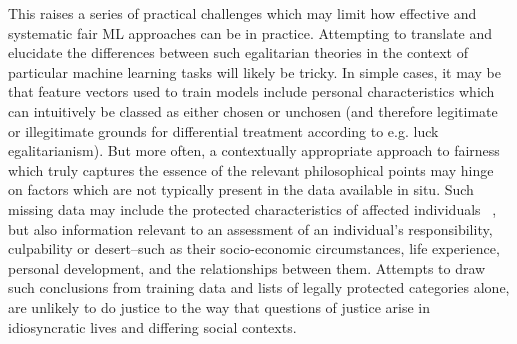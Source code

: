 \documentclass[pmlr,twocolumn,10pt]{jmlr}%
\begin{document}
This raises a series of practical challenges which may limit how effective and systematic fair ML approaches can be in practice. Attempting to translate and elucidate the differences between such egalitarian theories in the context of particular machine learning tasks will likely be tricky. In simple cases, it may be that feature vectors used to train models include personal characteristics which can intuitively be classed as either chosen or unchosen (and therefore legitimate or illegitimate grounds for differential treatment according to e.g. luck egalitarianism). But more often, a contextually appropriate approach to fairness which truly captures the essence of the relevant philosophical points may hinge on factors which are not typically present in the data available in situ. Such missing data may include the protected characteristics of affected individuals ~\cite{veale2017fairer}, but also information relevant to an assessment of an individual's responsibility, culpability or desert--such as their socio-economic circumstances, life experience, personal development, and the relationships between them. Attempts to draw such conclusions from training data and lists of legally protected categories alone, are unlikely to do justice to the way that questions of justice arise in idiosyncratic lives and differing social contexts.




\appendix




\end{document}
